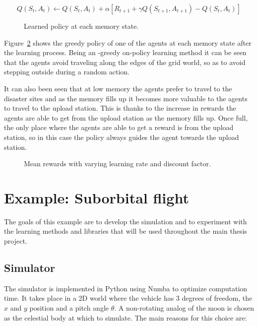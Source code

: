 \begin{equation}
    Q(S_t, A_t) \leftarrow Q(S_t, A_t) + \alpha \left [  R_{t+1} + \gamma Q(S_{t+1}, A_{t+1})- Q(S_t, A_t) \right ]
    \label{fig:qr_learning_rule}
\end{equation}

\begin{figure}[ht]			
	\centering
				
	\caption{Learned policy at each memory state.}
	\label{fig:qr_mean_rewards}
\end{figure}

Figure~\ref{fig:qr_learned_policy} shows the greedy policy of one of the agents at each memory state after the learning process. Being an \eps-greedy on-policy learning method it can be seen that the agents avoid traveling along the edges of the grid world, so as to avoid stepping outside during a random action.

It can also been seen that at low memory the agents prefer to travel to the disaster sites and as the memory fills up it becomes more valuable to the agents to travel to the upload station. This is thanks to the increase in rewards the agents are able to get from the upload station as the memory fills up. Once full, the only place where the agents are able to get a reward is from the upload station, so in this case the policy always guides the agent towards the upload station.

\begin{figure}[ht]			
	\centering
				
	\caption{Mean rewards with varying learning rate and discount factor.}
	\label{fig:qr_learned_policy}
\end{figure}

\newpage
\section{Example: Suborbital flight}
The goals of this example are to develop the simulation and to experiment with the learning methods and libraries that will be used throughout the main thesis project. 

\subsection{Simulator}

The simulator is implemented in Python using Numba to optimize computation time. It takes place in a 2D world where the vehicle has 3 degrees of freedom, the $x$ and $y$ position and a pitch angle $\theta$. A non-rotating analog of the moon is chosen as the celestial body at which to simulate. The main reasons for this choice are:

